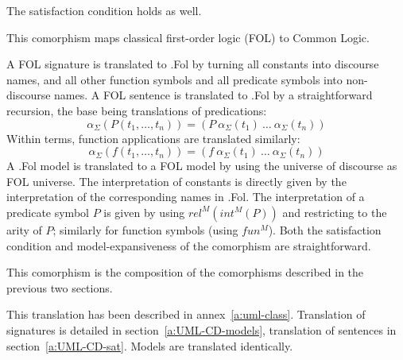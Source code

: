 \documentclass[10pt, a4paper]{isov2}
\newcommand*{\CL}{\ensuremath{\mathsf{CL}}\xspace}
\begin{document}
	The satisfaction condition holds as well.


\ssclause{$FOL \rightarrow \CL$}

This comorphism  maps classical first-order logic (FOL) to Common Logic.


A FOL signature is translated to \Clogic.Fol by turning all constants
into discourse names, and all other function symbols and all predicate
symbols into non-discourse names. A FOL sentence is translated
to \Clogic.Fol by a straightforward recursion, the base being translations
of predications:
$$\alpha_\Sigma(P(t_1,\ldots,t_n)) = (P\ \alpha_\Sigma(t_1)\ \ldots\ \alpha_\Sigma(t_n))$$
Within terms, function applications are translated similarly:
$$\alpha_\Sigma(f(t_1,\ldots,t_n)) = (f\ \alpha_\Sigma(t_1)\ \ldots\ \alpha_\Sigma(t_n))$$
A \Clogic.Fol model is translated to a FOL model by using the universe of
discourse as FOL universe. The interpretation of constants is
directly given by the interpretation of the corresponding names
in \Clogic.Fol. The interpretation of a predicate symbol $P$ is given
by using $rel^M(int^M(P))$ and restricting to the arity of $P$;
similarly for function symbols (using $fun^M$). Both the satisfaction condition
and model-expansiveness of the comorphism are straightforward.


\ssclause{$\OWL \rightarrow \CL$}

This comorphism is the composition of the comorphisms described in the previous
two sections.

\ssclause{UML class models $\to \CL$}


This translation has been described in annex~\ref{a:uml-class}. 
Translation of signatures is detailed in section~\ref{a:UML-CD-models},
translation of sentences in section~\ref{a:UML-CD-sat}.
Models are translated identically.

\end{document}
